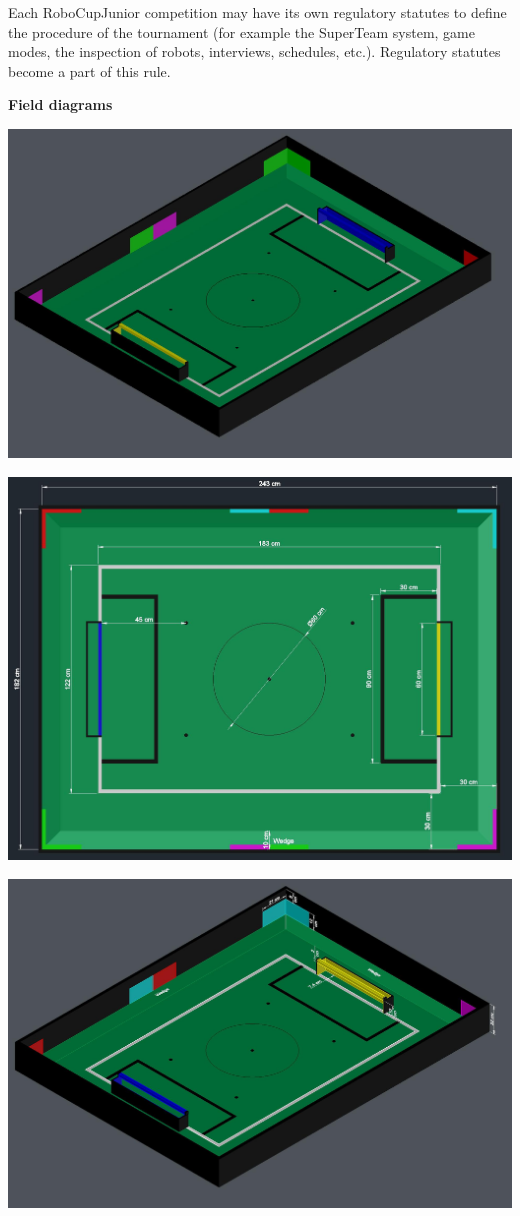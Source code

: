 \documentclass{article}
\begin{document}
Each RoboCupJunior competition may have its own regulatory statutes to define
the procedure of the tournament (for example the SuperTeam system, game modes,
the inspection of robots, interviews, schedules, etc.). Regulatory statutes
become a part of this rule.

\textbf{Field diagrams}

\includegraphics[width=1\textwidth]{media/image5.jpeg}

\includegraphics[width=1\textwidth]{media/image6.jpeg}

\includegraphics[width=1\textwidth]{media/image7.jpeg}
\end{document}
